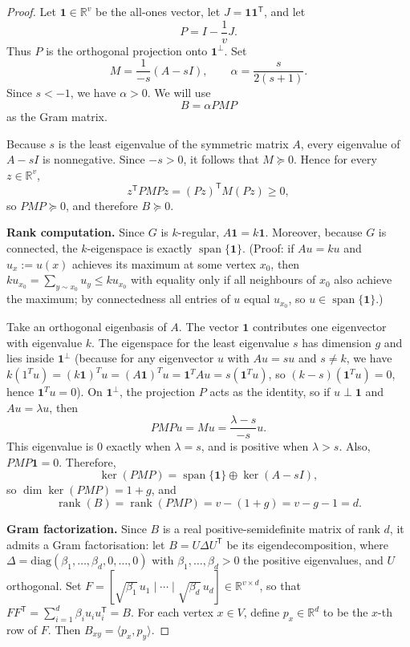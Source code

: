 \begin{proof}
Let $\mathbf 1\in\mathbb R^v$ be the all-ones vector, let $J=\mathbf 1\mathbf 1^{\mathsf T}$, and let
\[
P=I-\frac{1}{v}J.
\]
Thus $P$ is the orthogonal projection onto $\mathbf 1^\perp$. Set
\[
M=\frac{1}{-s}(A-sI),
\qquad
\alpha=\frac{s}{2(s+1)}.
\]
Since $s<-1$, we have $\alpha>0$. We will use
\[
B=\alpha PMP
\]
as the Gram matrix.

Because $s$ is the least eigenvalue of the symmetric matrix $A$, every eigenvalue of $A-sI$ is nonnegative. Since $-s>0$, it follows that $M\succeq 0$. Hence for every $z\in\mathbb R^v$,
\[
z^{\mathsf T}PMPz=(Pz)^{\mathsf T}M(Pz)\ge 0,
\]
so $PMP\succeq 0$, and therefore $B\succeq 0$.

\textbf{Rank computation.} Since $G$ is $k$-regular, $A\mathbf 1=k\mathbf 1$. Moreover, because $G$ is connected, the $k$-eigenspace is exactly $\operatorname{span}\{\mathbf 1\}$. (Proof: if $Au=ku$ and $u_x:=u(x)$ achieves its maximum at some vertex $x_0$, then $ku_{x_0}=\sum_{y\sim x_0}u_y\le ku_{x_0}$ with equality only if all neighbours of $x_0$ also achieve the maximum; by connectedness all entries of $u$ equal $u_{x_0}$, so $u\in\operatorname{span}\{\mathbf 1\}$.)

Take an orthogonal eigenbasis of $A$. The vector $\mathbf 1$ contributes one eigenvector with eigenvalue $k$. The eigenspace for the least eigenvalue $s$ has dimension $g$ and lies inside $\mathbf 1^\perp$ (because for any eigenvector $u$ with $Au = s u$ and $s \ne k$, we have $k(1^T u) = (k\mathbf{1})^T u = (A\mathbf{1})^T u = \mathbf{1}^T A u = s(\mathbf{1}^T u)$, so $(k-s)(\mathbf{1}^T u)=0$, hence $\mathbf{1}^T u = 0$). On $\mathbf 1^\perp$, the projection $P$ acts as the identity, so if $u\perp \mathbf 1$ and $Au=\lambda u$, then
\[
PMPu=Mu=\frac{\lambda-s}{-s}u.
\]
This eigenvalue is $0$ exactly when $\lambda=s$, and is positive when $\lambda>s$. Also, $PMP\mathbf 1=0$. Therefore,
\[
\ker(PMP)=\operatorname{span}\{\mathbf 1\}\oplus \ker(A-sI),
\]
so $\dim\ker(PMP)=1+g$, and
\[
\operatorname{rank}(B)=\operatorname{rank}(PMP)=v-(1+g)=v-g-1=d.
\]

\textbf{Gram factorization.} Since $B$ is a real positive-semidefinite matrix of rank $d$, it admits a Gram factorisation: let $B=U\Delta U^{\mathsf T}$ be its eigendecomposition, where $\Delta=\mathrm{diag}(\beta_1,\ldots,\beta_d,0,\ldots,0)$ with $\beta_1,\ldots,\beta_d>0$ the positive eigenvalues, and $U$ orthogonal. Set $F=[{\sqrt{\beta_1}}\,u_1\mid \cdots\mid {\sqrt{\beta_d}}\,u_d]\in\mathbb R^{v\times d}$, so that $FF^{\mathsf T}=\sum_{i=1}^d\beta_i u_i u_i^{\mathsf T}=B$. For each vertex $x\in V$, define $p_x\in\mathbb R^d$ to be the $x$-th row of $F$. Then $B_{xy}=\langle p_x,p_y\rangle$.


\end{proof}
